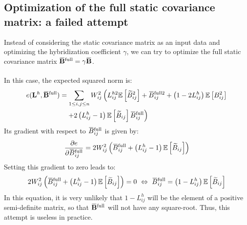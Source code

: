\documentclass[12pt]{scrartcl}
\newcommand{\overbar}[1]{\mkern 1.5mu\overline{\mkern-1.5mu#1\mkern-1.5mu}\mkern 1.5mu}
\begin{document}
\subsection{Optimization of the full static covariance matrix: a failed attempt}
Instead of considering the static covariance matrix as an input data and optimizing the hybridization coefficient $\gamma$, we can try to optimize the full static covariance matrix $\overbar{\mathbf{B}}^\mathrm{full} = \gamma \overbar{\mathbf{B}}$.\\
$  $\\
In this case, the expected squared norm is:
\begin{align}
e(\mathbf{L}^h,\overbar{\mathbf{B}}^\mathrm{full}) & = \sum_{1 \le i,j \le n} W_{ij}^2 \left(L^{h2}_{ij} \mathbb{E} \left[\widetilde{B}_{ij}^2\right] + \overbar{B}^{\mathrm{full}2}_{ij} + \left(1 - 2 L^h_{ij}\right) \mathbb{E} \left[B^2_{ij}\right] \right. \nonumber \\
& \left. \quad + 2 \left(L^h_{ij} - 1\right)  \mathbb{E} \left[\widetilde{B}_{ij}\right] \overbar{B}^\mathrm{full}_{ij} \right)
\end{align}
Its gradient with respect to $\overbar{B}^\mathrm{full}_{ij}$ is given by:
\begin{align}
\frac{\partial e}{\partial \overbar{B}^\mathrm{full}_{ij}} = 2 W_{ij}^2 \left(\overbar{B}^\mathrm{full}_{ij} + \left(L^h_{ij} - 1\right) \mathbb{E} \left[\widetilde{B}_{ij}\right]\right)
\end{align}
Setting this gradient to zero leads to:
\begin{align}
2 W_{ij}^2 \left(\overbar{B}^\mathrm{full}_{ij} + \left(L^h_{ij} - 1\right) \mathbb{E} \left[\widetilde{B}_{ij}\right] \right) = 0 \ \Leftrightarrow \ \overbar{B}^\mathrm{full}_{ij} = \left(1 - L^h_{ij}\right) \mathbb{E}\left[ \widetilde{B}_{ij}\right]
\end{align}
In this equation, it is very unlikely that $1 - L^h_{ij}$ will be the element of a positive semi-definite matrix, so that $\overbar{\mathbf{B}}^\mathrm{full}$ will not have any square-root. Thus, this attempt is useless in practice.
\end{document}
